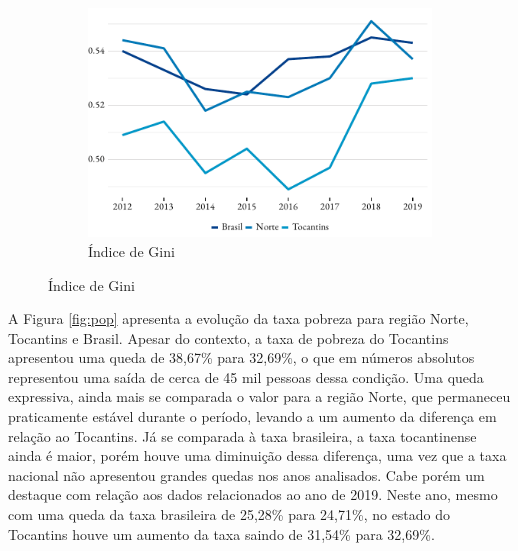 \begin{figure}[!h]
\begin{subfigure}{\linewidth}
	\end{subfigure}
	\begin{subfigure}{\linewidth}
		\caption{Índice de Gini}
		\label{fig:gini}
		\includegraphics{fig/gini.pdf}
	\end{subfigure}
\end{figure}
\par A Figura \ref{fig:pop} apresenta a evolução da taxa pobreza para região Norte, Tocantins e Brasil. Apesar do contexto, a taxa de pobreza do Tocantins apresentou uma queda de 38,67\% para 32,69\%, o que em números absolutos representou uma saída de cerca de 45 mil pessoas dessa condição. Uma queda expressiva, ainda mais se comparada o valor para a região Norte, que permaneceu praticamente estável durante o período, levando a um aumento da diferença em relação ao Tocantins. Já se comparada à taxa brasileira, a taxa tocantinense ainda é maior, porém houve uma diminuição dessa diferença, uma vez que a taxa nacional não apresentou grandes quedas nos anos analisados. Cabe porém um destaque com relação aos dados relacionados ao ano de 2019. Neste ano, mesmo com uma queda da taxa brasileira de 25,28\% para 24,71\%, no estado do Tocantins houve um aumento da taxa saindo de 31,54\% para 32,69\%.

